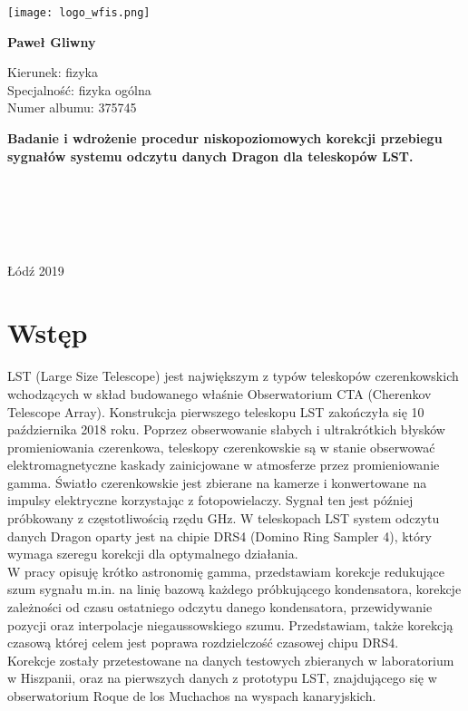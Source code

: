 \documentclass[a4paper,11pt,twoside]{article}
\renewcommand\maketitle{
\begin{titlepage}
 \begin{center}
  \texttt{[image: logo\_wfis.png]}
  
  \vspace{1cm} 
  \LARGE\textbf{Paweł Gliwny}
  
  \vspace{1cm}
  \begin{flushleft}
  \normalsize{Kierunek: fizyka} \\
  \normalsize{Specjalność: fizyka ogólna} \\
  \normalsize{Numer albumu: 375745}
  \end{flushleft} 
      
  \vspace{1cm}  
  \LARGE\textbf{{Badanie i wdrożenie procedur
niskopoziomowych korekcji przebiegu
sygnałów systemu odczytu danych Dragon
dla teleskopów LST.}}
   
   
  \vspace{2,5cm}
  \begin{flushleft}
  \normalsize\textbf{\hspace*{7,2cm}{Praca magisterska}} \\
  \normalsize{\hspace*{7,9cm}{wykonana pod kierunkiem}\\ \hspace*{7,9cm}{prof. UŁ dr hab.} \\ \hspace*{7,9cm}{Julian Sitarek} \\ \hspace*{7,9cm}{w Katedrze Astrofizyki}} 
  \end{flushleft}
   \begin{flushright}
   \end{flushright}

  
  \vfill
  \normalsize{Łódź 2019}
  \end{center}
\end{titlepage}}
\begin{document}
\maketitle
\tableofcontents
\newpage
\setcounter{page}{1}
\section{Wstęp}
LST (Large Size Telescope) jest największym z typów teleskopów czerenkowskich wchodzących w skład budowanego właśnie Obserwatorium CTA (Cherenkov Telescope Array). Konstrukcja pierwszego teleskopu LST zakończyła się 10 października 2018 roku. Poprzez obserwowanie słabych i ultrakrótkich błysków promieniowania czerenkowa, teleskopy czerenkowskie są w stanie obserwować elektromagnetyczne kaskady zainicjowane w atmosferze przez promieniowanie gamma. Światło czerenkowskie jest zbierane na kamerze i konwertowane na impulsy elektryczne korzystając z fotopowielaczy. Sygnał ten jest później próbkowany z częstotliwością rzędu GHz. W teleskopach LST system odczytu danych Dragon oparty jest na chipie DRS4 (Domino Ring Sampler 4), który wymaga szeregu korekcji dla optymalnego działania. \\
W pracy opisuję krótko astronomię gamma, przedstawiam korekcje redukujące szum sygnału m.in. na linię bazową każdego próbkującego kondensatora, korekcje zależności od czasu ostatniego odczytu danego kondensatora, przewidywanie pozycji oraz interpolacje niegaussowskiego szumu. Przedstawiam, także korekcją czasową której celem jest poprawa rozdzielczość czasowej chipu DRS4. \\
Korekcje zostały przetestowane na danych testowych zbieranych w laboratorium w Hiszpanii, oraz na pierwszych danych z prototypu LST, znajdującego się w obserwatorium Roque de los Muchachos na wyspach kanaryjskich.  
\newpage
\end{document}

